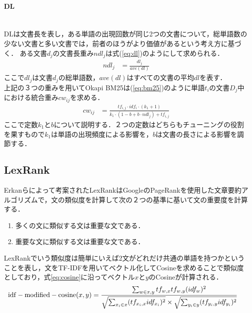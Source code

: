 \paragraph{DL}\ \\
DLは文書長を表し，ある単語の出現回数が同じ2つの文書について，総単語数の少ない文書と多い文書では，前者のほうがより価値があるという考え方に基づく．
ある文書$d_j$の文書長重み$ndl_j$は式(\ref{eq:dl})のようにして求められる．
\begin{equation}
\begin{aligned}
\label{eq:dl}
ndl_{j} & = \frac{dl_j}{ave(dl)}
\end{aligned}
\end{equation}
ここで$dl_j$は文書$d_j$の総単語数，$ave(dl)$はすべての文書の平均$dl$を表す．
\\
上記の３つの重みを用いてOkapi BM25は(\ref{eq:bm25})のように単語$t_i$の文書$D_j$中における統合重み$cw_{ij}$を求める．
\begin{equation}
\begin{aligned}
\label{eq:bm25}
cw_{ij} & = \frac{tf_{i,j} \cdot idf_{i} \cdot (k_1+ 1)}{k_1 \cdot (1 - b + b \cdot ndl_{j}  ) + tf_{i,j}  }
\end{aligned}
\end{equation}
ここで定数$k_1$と$b$について説明する．２つの定数はどちらもチューニングの役割を果すもので$k_1$は単語の出現頻度による影響を，$b$は文書の長さによる影響を調節する．
\subsection{LexRank}
Erkanら\cite{lexRank}によって考案されたLexRankはGoogleのPageRank\cite{pageRank1999}を使用した文章要約アルゴリズムで，文の類似度を計算して次の２つの基準に基いて文の重要度を計算する．
\begin{enumerate}
  \item 多くの文に類似する文は重要な文である．
  \item 重要な文に類似する文は重要な文である．
\end{enumerate}
LexRankでいう類似度は簡単にいえば2文がどれだけ共通の単語を持つかということを表し，文をTF-IDFを用いてベクトル化してCosineを求めることで類似度としており，式\ref{eq:cosine}に沿ってベクトル$x$と$y$のCosineが計算される．
\begin{equation}
\begin{aligned}
\label{eq:cosine}
{\rm idf-modified-cosine}(x,y) & = \frac{\sum_{w \in x,y} tf_{w,x} tf_{w,y} (idf_w)^2} {\sqrt{ \sum_{x_i \in x} ( tf_{x_i,x} idf_{x_i} )^2  } \times \sqrt{ \sum_{y_i \in y} ( tf_{y_i,y} idf_{y_i} )^2  }}
\end{aligned}
\end{equation}

